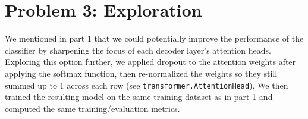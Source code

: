 \documentclass[10pt]{article}
\newcommand{\code}[1]{\texttt{#1}}
\theoremstyle{definition}
\begin{document}
\section{Problem 3: Exploration}

\noindent We mentioned in part 1 that we could potentially improve the performance of the classifier by sharpening the focus of each decoder layer's attention heads. Exploring this option further, we applied dropout to the attention weights after applying the softmax function, then re-normalized the weights so they still summed up to 1 across each row (see \code{transformer.AttentionHead}). We then trained the resulting model on the same training dataset as in part 1 and computed the same training/evaluation metrics.



\end{document}
